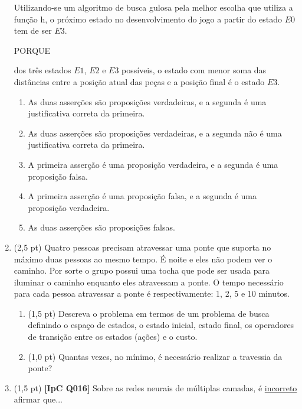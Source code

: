 \documentclass[12pt,a4paper,oneside]{article}
\begin{document}
\begin{enumerate}
		Utilizando-se um algoritmo de busca gulosa pela melhor escolha que utiliza a função h, o próximo estado no desenvolvimento do jogo a partir do estado $E0$ tem de ser $E3$.
		
		\begin{center}
			PORQUE
		\end{center}
		
		dos três estados $E1$, $E2$ e $E3$ possíveis, o estado com menor soma das distâncias entre a posição atual das peças e a posição final é o estado $E3$.
		
		\begin{enumerate}
			\item As duas asserções são proposições verdadeiras, e a segunda é uma justificativa correta da primeira.
			\item As duas asserções são proposições verdadeiras, e a segunda não é uma justificativa correta da primeira.
			\item A primeira asserção é uma proposição verdadeira, e a segunda é uma proposição falsa.
			\item A primeira asserção é uma proposição falsa, e a segunda é uma proposição verdadeira.
			\item As duas asserções são proposições falsas.
		\end{enumerate}
	
		\item (2,5 pt) Quatro pessoas precisam atravessar uma ponte que suporta no máximo duas pessoas ao mesmo tempo. É noite e eles não podem ver o caminho. Por sorte o grupo possui uma tocha que pode ser usada para iluminar o caminho enquanto eles atravessam a ponte. O tempo necessário para cada pessoa atravessar a ponte é respectivamente: 1, 2, 5 e 10 minutos. 
	
	\begin{enumerate}
		\item (1,5 pt) Descreva o problema em termos de um problema de busca definindo o espaço de estados, o estado inicial, estado final, os operadores de transição entre os estados (ações) e o custo.
		\item (1,0 pt) Quantas vezes, no mínimo, é necessário realizar a travessia da ponte?
	\end{enumerate}

\newpage

	\item (1,5 pt) {\bf [IpC Q016]} Sobre as redes neurais de múltiplas camadas, é \underline{incorreto} afirmar que...


\end{enumerate}
\end{document}
